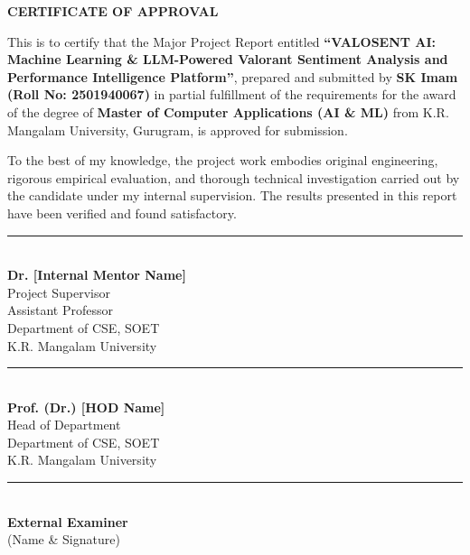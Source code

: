 \newpage
\thispagestyle{plain}
\begin{center}
    {\Large \bfseries \color{krmunavy} CERTIFICATE OF APPROVAL}\\[1.0cm]
\end{center}

\noindent This is to certify that the Major Project Report entitled \textbf{``VALOSENT AI: Machine Learning \& LLM-Powered Valorant Sentiment Analysis and Performance Intelligence Platform''}, prepared and submitted by \textbf{SK Imam (Roll No: 2501940067)} in partial fulfillment of the requirements for the award of the degree of \textbf{Master of Computer Applications (AI \& ML)} from K.R. Mangalam University, Gurugram, is approved for submission.

\vspace{0.6cm}
\noindent To the best of my knowledge, the project work embodies original engineering, rigorous empirical evaluation, and thorough technical investigation carried out by the candidate under my internal supervision. The results presented in this report have been verified and found satisfactory.

\vspace{3.0cm}
\noindent
\begin{minipage}[t]{0.48\textwidth}
    \rule{6cm}{0.6pt}\\[0.2cm]
    \textbf{Dr. [Internal Mentor Name]}\\
    Project Supervisor\\
    Assistant Professor\\
    Department of CSE, SOET\\
    K.R. Mangalam University
\end{minipage}
\hfill
\begin{minipage}[t]{0.48\textwidth}
    \begin{flushright}
        \rule{6cm}{0.6pt}\\[0.2cm]
        \textbf{Prof. (Dr.) [HOD Name]}\\
        Head of Department\\
        Department of CSE, SOET\\
        K.R. Mangalam University
    \end{flushright}
\end{minipage}

\vspace{2.5cm}
\noindent
\begin{center}
    \rule{7cm}{0.6pt}\\[0.2cm]
    \textbf{External Examiner}\\
    (Name \& Signature)
\end{center}

